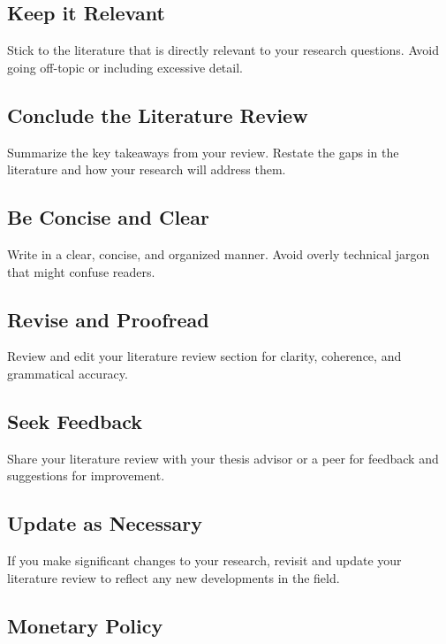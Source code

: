\documentclass[../thesis.tex]{subfiles}
\begin{document}
	\begin{tcolorbox}[colback=red!5!white,colframe=red!75!black]
	
	\subsection*{Keep it Relevant}
	Stick to the literature that is directly relevant to your research questions. Avoid going off-topic or including excessive detail.
	
	\subsection*{Conclude the Literature Review}
	Summarize the key takeaways from your review. Restate the gaps in the literature and how your research will address them.
	
	\subsection*{Be Concise and Clear}
	Write in a clear, concise, and organized manner. Avoid overly technical jargon that might confuse readers.
	
	\subsection*{Revise and Proofread}
	Review and edit your literature review section for clarity, coherence, and grammatical accuracy.
	
	\subsection*{Seek Feedback}
	Share your literature review with your thesis advisor or a peer for feedback and suggestions for improvement.
	
	\subsection*{Update as Necessary}
	If you make significant changes to your research, revisit and update your literature review to reflect any new developments in the field.
	
	\end{tcolorbox}
	
	\newpage
	
	\subsection*{Monetary Policy}
	
\end{document}
